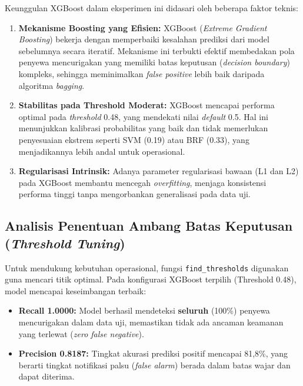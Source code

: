 Keunggulan XGBoost dalam eksperimen ini didasari oleh beberapa faktor teknis:
\begin{enumerate}
    \item \textbf{Mekanisme Boosting yang Efisien:} XGBoost (\textit{Extreme Gradient Boosting}) bekerja dengan memperbaiki kesalahan prediksi dari model sebelumnya secara iteratif. Mekanisme ini terbukti efektif membedakan pola penyewa mencurigakan yang memiliki batas keputusan (\textit{decision boundary}) kompleks, sehingga meminimalkan \textit{false positive} lebih baik daripada algoritma \textit{bagging}.
    
    \item \textbf{Stabilitas pada Threshold Moderat:} XGBoost mencapai performa optimal pada \textit{threshold} 0.48, yang mendekati nilai \textit{default} 0.5. Hal ini menunjukkan kalibrasi probabilitas yang baik dan tidak memerlukan penyesuaian ekstrem seperti SVM (0.19) atau BRF (0.33), yang menjadikannya lebih andal untuk operasional.
    
    \item \textbf{Regularisasi Intrinsik:} Adanya parameter regularisasi bawaan (L1 dan L2) pada XGBoost membantu mencegah \textit{overfitting}, menjaga konsistensi performa tinggi tanpa mengorbankan generalisasi pada data uji.
\end{enumerate}

\subsection{Analisis Penentuan Ambang Batas Keputusan (\textit{Threshold Tuning})}
Untuk mendukung kebutuhan operasional, fungsi \texttt{find\_thresholds} digunakan guna mencari titik optimal. Pada konfigurasi XGBoost terpilih (Threshold 0.48), model mencapai keseimbangan terbaik:
\begin{itemize}
    \item \textbf{Recall 1.0000:} Model berhasil mendeteksi \textbf{seluruh} (100\%) penyewa mencurigakan dalam data uji, memastikan tidak ada ancaman keamanan yang terlewat (\textit{zero false negative}).
    \item \textbf{Precision 0.8187:} Tingkat akurasi prediksi positif mencapai 81,8\%, yang berarti tingkat notifikasi palsu (\textit{false alarm}) berada dalam batas wajar dan dapat diterima.
\end{itemize}

